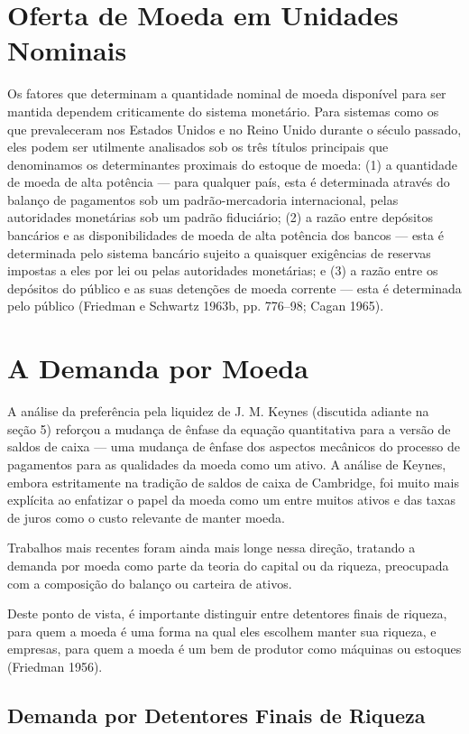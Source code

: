 \documentclass[12pt]{article}
\begin{document}
\section{Oferta de Moeda em Unidades Nominais}

Os fatores que determinam a quantidade nominal de moeda disponível para ser mantida dependem criticamente do sistema monetário. Para sistemas como os que prevaleceram nos Estados Unidos e no Reino Unido durante o século passado, eles podem ser utilmente analisados sob os três títulos principais que denominamos os determinantes proximais do estoque de moeda: (1) a quantidade de moeda de alta potência — para qualquer país, esta é determinada através do balanço de pagamentos sob um padrão-mercadoria internacional, pelas autoridades monetárias sob um padrão fiduciário; (2) a razão entre depósitos bancários e as disponibilidades de moeda de alta potência dos bancos — esta é determinada pelo sistema bancário sujeito a quaisquer exigências de reservas impostas a eles por lei ou pelas autoridades monetárias; e (3) a razão entre os depósitos do público e as suas detenções de moeda corrente — esta é determinada pelo público (Friedman e Schwartz 1963b, pp. 776–98; Cagan 1965).

\section{A Demanda por Moeda}

A análise da preferência pela liquidez de J. M. Keynes (discutida adiante na seção 5) reforçou a mudança de ênfase da equação quantitativa para a versão de saldos de caixa — uma mudança de ênfase dos aspectos mecânicos do processo de pagamentos para as qualidades da moeda como um ativo. A análise de Keynes, embora estritamente na tradição de saldos de caixa de Cambridge, foi muito mais explícita ao enfatizar o papel da moeda como um entre muitos ativos e das taxas de juros como o custo relevante de manter moeda.

Trabalhos mais recentes foram ainda mais longe nessa direção, tratando a demanda por moeda como parte da teoria do capital ou da riqueza, preocupada com a composição do balanço ou carteira de ativos.

Deste ponto de vista, é importante distinguir entre detentores finais de riqueza, para quem a moeda é uma forma na qual eles escolhem manter sua riqueza, e empresas, para quem a moeda é um bem de produtor como máquinas ou estoques (Friedman 1956).

\subsection{Demanda por Detentores Finais de Riqueza}
\end{document}

